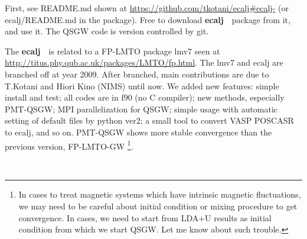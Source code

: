 \documentclass[a4paper,10pt,epsf,fleqn]{article}
\newcommand{\ecalj}{{\bf ecalj}\ }
\begin{document}


First, see README.md shown at 
\url{https://github.com/tkotani/ecalj#ecalj-} 
(or ecalj/README.md in the package).
Free to download \ecalj\ package from it, and use it.
The QSGW code is version controlled by git. 


The \ecalj\ is related to a FP-LMTO package lmv7 seen at\\
\url{http://titus.phy.qub.ac.uk/packages/LMTO/fp.html}. 
The lmv7 and ecalj are branched off at year 2009.
After branched, main contributions are 
due to T.Kotani and Hiori Kino (NIMS) until now. 
We added new features: simple install and test;
all codes are in f90 (no C compiler);
new methods, especially PMT-QSGW; MPI parallelization for QSGW;
simple usage with automatic setting of default files by python ver2;
a small tool to convert VASP POSCASR to ecalj, and so on.
PMT-QSGW shows more stable convergence than the previous version, FP-LMTO-GW
\footnote{In cases to treat magnetic
systems which have intrinsic magnetic fluctuations, 
we may need to be careful about initial condition or mixing procedure
to get convergence. In cases, we need to start from LDA+U results as initial
condition from which we start QSGW. Let me know about such trouble.}.

\ \\
\end{document}
